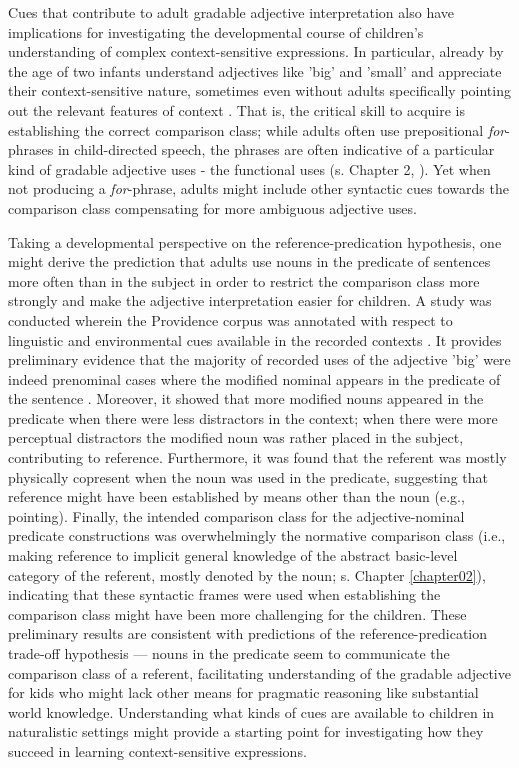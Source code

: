 Cues that contribute to adult gradable adjective interpretation also have implications for investigating the developmental course of children's understanding of complex context-sensitive expressions. In particular, already by the age of two infants understand adjectives like 'big' and 'small' and appreciate their context-sensitive nature, sometimes even without adults specifically pointing out the relevant features of context \parencite{Mintz2002, ebeling1994children}. That is, the critical skill to acquire is establishing the correct comparison class; while adults often use prepositional \emph{for}-phrases in child-directed speech, the phrases are often indicative of a particular kind of gradable adjective uses - the functional uses (s. Chapter 2, \textcite{ebeling1994children}). Yet when not producing a \emph{for}-phrase, adults might include other syntactic cues towards the comparison class compensating for more ambiguous adjective uses. 

Taking a developmental perspective on the reference-predication hypothesis, one might derive the prediction that adults use nouns in the predicate of sentences more often than in the subject in order to restrict the comparison class more strongly and make the adjective interpretation easier for children. A study was conducted wherein the Providence corpus was annotated with respect to linguistic and environmental cues available in the recorded contexts \parencite{sinelnikova2020}. It provides preliminary evidence that the majority of recorded uses of the adjective 'big' were indeed prenominal cases where the modified nominal appears in the predicate of the sentence \parencite{sinelnikova2020}. 
Moreover, it showed that more modified nouns appeared in the predicate when there were less distractors in the context; when there were more perceptual distractors the modified noun was rather placed in the subject, contributing to reference. Furthermore, it was found that the referent was mostly physically copresent when the noun was used in the predicate, suggesting that reference might have been established by means other than the noun (e.g., pointing). Finally, the intended comparison class for the adjective-nominal predicate constructions was overwhelmingly the normative comparison class (i.e., making reference to implicit general knowledge of the abstract basic-level  category of the referent, mostly denoted by the noun; s. Chapter \ref{chapter02}), indicating that these syntactic frames were used when establishing the comparison class might have been more challenging for the children. These preliminary results are consistent with predictions of the reference-predication trade-off hypothesis ---  nouns in the predicate seem to communicate the comparison class of a referent, facilitating understanding of the gradable adjective for kids who might lack other means for pragmatic reasoning like substantial world knowledge. 
Understanding what kinds of cues are available to children in naturalistic settings might provide a starting point for investigating how they succeed in learning context-sensitive expressions. 

